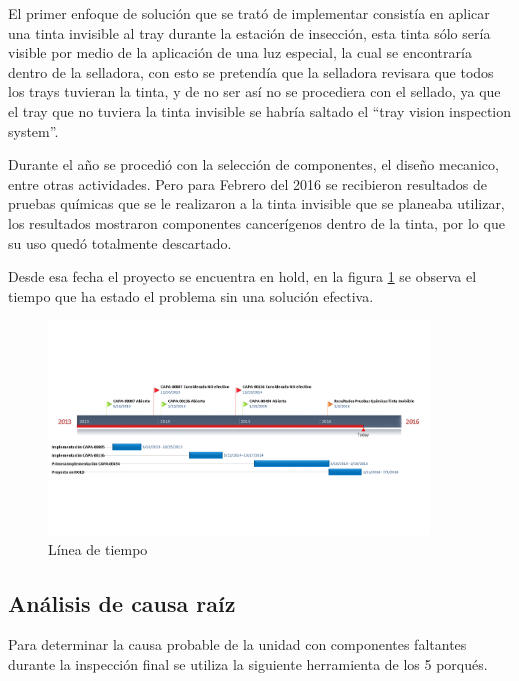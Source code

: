 \documentclass[12pt, twoside, letterpaper]{book}
\begin{document}
El primer enfoque de soluci\'on que se trat\'o de implementar consist\'ia en aplicar una tinta invisible al tray durante la estaci\'on de insecci\'on,
esta tinta s\'olo ser\'ia visible por medio de la aplicaci\'on de una luz especial, la cual se encontrar\'ia dentro de la selladora,
con esto se pretend\'ia que la selladora revisara que todos los trays tuvieran la tinta, y de no ser as\'i no se procediera
con el sellado, ya que el tray que no tuviera la tinta invisible se habr\'ia saltado el \enquote{tray vision inspection system}.

Durante el a\~no se procedi\'o con la selecci\'on de componentes, el dise\~no mecanico, entre otras actividades.
Pero para Febrero del 2016 se recibieron resultados de pruebas qu\'imicas que se le realizaron a la tinta invisible que se planeaba
utilizar, los resultados mostraron componentes cancer\'igenos dentro de la tinta, por lo que su uso qued\'o totalmente descartado.

Desde esa fecha el proyecto se encuentra en hold, en la figura \ref{fig:timeline} se observa el tiempo que ha estado el problema sin una soluci\'on efectiva.

\begin{figure}[htb]
  \centering
  \includegraphics[width=0.9\textwidth]{timeline}
  \caption{L\'inea de tiempo}
  \label{fig:timeline}
\end{figure}


\subsection{An\'alisis de causa ra\'iz}
Para determinar la causa probable de la unidad con componentes faltantes durante la
inspecci\'on final se utiliza la siguiente herramienta de los 5 porqu\'es.
\end{document}
